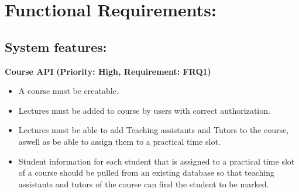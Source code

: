 \documentclass[12pt]{article}
\begin{document}
	\vspace{0.5in}
	
	\section{Functional Requirements:}
	\vspace{0.2in}
		
		\subsection{System features:}
		\vspace{0.15in}
		
		\hspace{0.2in}\textbf{Course API}
		\newline\textbf{(Priority: High, Requirement: FRQ1)}
		\begin{itemize}
			\item A course must be creatable.
			\item Lectures must be added to course by users with correct authorization.
			\item Lectures must be able to add Teaching assistants and Tutors to the course, aswell as be able to assign them to a practical time slot.
			\item Student information for each student that is assigned to a practical time slot of a course should be pulled from an existing database so that teaching assistants and tutors of the course can find the student to be marked.
		\end{itemize}
		
		\vspace{0.15in}
		
\end{document}
